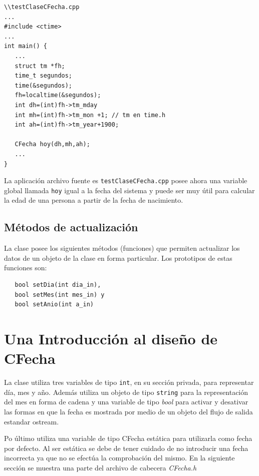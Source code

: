 \documentclass[10pt,a4paper]{article}
\begin{document}
\color{orange}
\begin{verbatim}
\\testClaseCFecha.cpp
...
#include <ctime>
...
int main() {
   ...
   struct tm *fh;
   time_t segundos;
   time(&segundos);
   fh=localtime(&segundos);
   int dh=(int)fh->tm_mday
   int mh=(int)fh->tm_mon +1; // tm en time.h
   int ah=(int)fh->tm_year+1900;

   CFecha hoy(dh,mh,ah);
   ...
}
\end{verbatim}
\color{black}

La aplicaci\'on archivo fuente es \texttt{testClaseCFecha.cpp} posee ahora una variable global llamada \texttt{hoy} igual a la fecha del sistema y puede ser muy \'util para calcular la edad de una persona a partir de la fecha de nacimiento.

\subsection*{M\'etodos de actualizaci\'on}

La clase posee los siguientes m\'etodos (funciones) que permiten actualizar los datos de un objeto de la clase en forma particular. Los prototipos de estas funciones son: \\
\color{orange}
\begin{verbatim}
   bool setDia(int dia_in), 
   bool setMes(int mes_in) y 
   bool setAnio(int a_in)
\end{verbatim}
\color{black}




\section*{Una Introducci\'on al dise\~no de CFecha}
La clase utiliza tres variables de tipo \texttt{int}, en su secci\'on privada, para representar d\'ia, mes y a\~no. Adem\'as utiliza un objeto de tipo \texttt{string} para la representaci\'on del mes en forma de cadena y una variable de tipo \textit{bool} para activar y desativar las formas en que la fecha es mostrada por medio de un objeto del flujo de salida estandar ostream.

Po \'ultimo utiliza una variable de tipo CFecha est\'atica para utilizarla como fecha por defecto. Al ser est\'atica se debe de tener cuidado de no introducir una fecha incorrecta ya que no se efect\'ua la comprobaci\'on del mismo. En la siguiente secci\'on se muestra una parte del archivo de cabecera \textit{CFecha.h}
\end{document}
